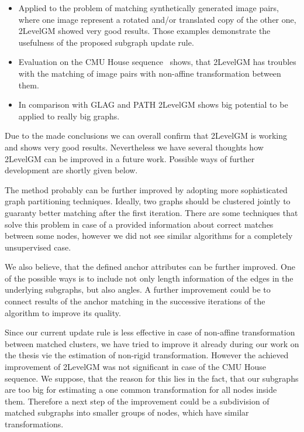 \begin{itemize}
\item Applied to the problem of matching synthetically generated image pairs, where one image represent a rotated and/or translated copy of the other one, 2LevelGM showed very good results.
Those examples demonstrate the usefulness of the proposed subgraph update rule.
\item Evaluation on the CMU House sequence~\cite{CMUHouse} shows, that 2LevelGM has troubles with the matching of image pairs with non-affine transformation between them.
\item In comparison with GLAG and PATH 2LevelGM shows big potential to be applied to really big graphs.
\end{itemize}

Due to the made conclusions we can overall confirm that 2LevelGM is working and shows very good results. Nevertheless we have several thoughts how 2LevelGM can be improved in a future work. Possible ways of further development are shortly given below.
 
The method probably can be further improved by adopting more sophisticated graph partitioning techniques. Ideally, two graphs should be clustered jointly to guaranty better matching after the first iteration. There are some techniques that solve this problem in case of a provided information about correct matches between some nodes, however we did not see similar algorithms for a completely unsupervised case.

We also believe, that the defined anchor attributes can be further improved. One of the possible ways is to include not only length information of the edges in the underlying subgraphs, but also angles. A further improvement could be to connect results of the anchor matching in the successive iterations of the algorithm to improve its quality.

Since our current update rule is less effective in case of non-affine transformation between matched clusters, we have tried to improve it already during our work on the thesis vie the estimation of non-rigid transformation. However the achieved improvement of 2LevelGM was not significant in case of the CMU House sequence. We suppose, that the reason for this lies in the fact, that our subgraphs are too big for estimating a one common transformation for all nodes inside them. Therefore a next step of the improvement could be a subdivision of matched subgraphs into smaller groups of nodes, which have similar transformations.

